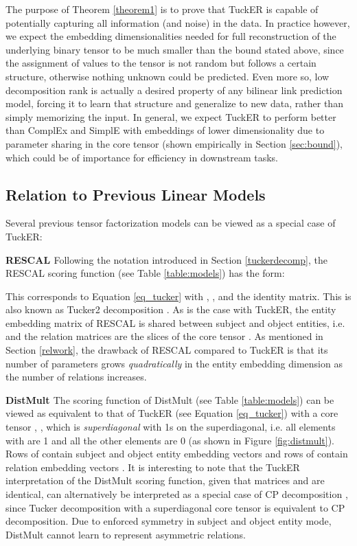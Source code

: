 \documentclass[11pt,a4paper]{article}
\newcommand{\keypoint}[1]{\vspace{0.1cm}\noindent\textbf{#1}\quad}
\begin{document}
The purpose of Theorem \ref{theorem1} is to prove that TuckER is capable of potentially capturing all information (and noise) in the data. In practice however, we expect the embedding dimensionalities needed for full reconstruction of the underlying binary tensor to be much smaller than the bound stated above, since the assignment of values to the tensor is not random but follows a certain structure, otherwise nothing unknown could be predicted. Even more so, low decomposition rank is actually a desired property of any bilinear link prediction model, forcing it to learn that structure and generalize to new data, rather than simply memorizing the input. In general, we expect TuckER to perform better than ComplEx and SimplE with embeddings of lower dimensionality due to parameter sharing in the core tensor (shown empirically in Section \ref{sec:bound}), which could be of importance for efficiency in downstream tasks. 


\subsection{Relation to Previous Linear Models}

Several previous tensor factorization models can be viewed as a special case of TuckER:

\keypoint{RESCAL \cite{nickel2011three}} Following the notation introduced in Section \ref{tuckerdecomp}, the RESCAL scoring function (see Table \ref{table:models}) has the form: 
\vspace{-0.2cm}

This corresponds to Equation \ref{eq_tucker} with , ,  and  the  identity matrix. This is also known as Tucker2 decomposition \cite{kolda2009tensor}. As is the case with TuckER, the entity embedding matrix of RESCAL is shared between subject and object entities, i.e.  and the relation matrices  are the  slices of the core tensor . As mentioned in Section \ref{relwork}, the drawback of RESCAL compared to TuckER is that its number of parameters grows \emph{quadratically} in the entity embedding dimension  as the number of relations increases. 

\keypoint{DistMult \cite{yang2014embedding}} The scoring function of DistMult (see Table \ref{table:models}) can be viewed as  equivalent to that of TuckER (see Equation \ref{eq_tucker}) with a core tensor , , which is \textit{superdiagonal} with 1s on the superdiagonal, i.e. all elements  with  are 1 and all the other elements are 0 (as shown in Figure \ref{fig:distmult}). Rows of  contain subject and object entity embedding vectors  and rows of  contain relation embedding vectors . It is interesting to note that the TuckER interpretation of the DistMult scoring function, given that matrices  and  are identical, can alternatively be interpreted as a special case of CP decomposition \cite{hitchcock1927expression}, since Tucker decomposition with a superdiagonal core tensor is equivalent to CP decomposition. Due to enforced symmetry in subject and object entity mode, DistMult cannot learn to represent asymmetric relations.
\end{document}
